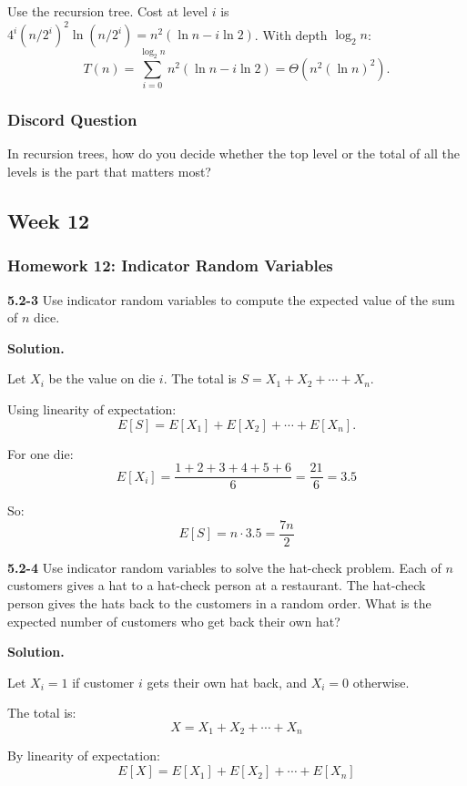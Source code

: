 \documentclass{article}
\theoremstyle{theorem}
\theoremstyle{definition}
\theoremstyle{remark}
\begin{document}
Use the recursion tree. Cost at level $i$ is $4^i(n/2^i)^2 \ln(n/2^i) = n^2(\ln n - i\ln 2)$. With depth $\log_2 n$:
\[
T(n) = \sum_{i=0}^{\log_2 n} n^2(\ln n - i\ln 2) = \Theta(n^2(\ln n)^2).
\]

\vspace{0.4cm}

\subsubsection{Discord Question}

In recursion trees, how do you decide whether the top level or the total of all the levels is the part that matters most?

\subsection{Week 12}

\subsubsection{Homework 12: Indicator Random Variables}

\textbf{5.2-3}
Use indicator random variables to compute the expected value of the sum of $n$ dice.

\textbf{Solution.}

Let $X_i$ be the value on die $i$. The total is $S = X_1 + X_2 + \cdots + X_n$.

Using linearity of expectation:
\[
E[S] = E[X_1] + E[X_2] + \cdots + E[X_n].
\]

For one die:
\[
E[X_i] = \frac{1 + 2 + 3 + 4 + 5 + 6}{6} = \frac{21}{6} = 3.5
\]

So:
\[
E[S] = n \cdot 3.5 = \frac{7n}{2}
\]

\vspace{0.3cm}

\textbf{5.2-4}
Use indicator random variables to solve the hat-check problem. Each of $n$ customers gives a hat to a hat-check person at a restaurant. The hat-check person gives the hats back to the customers in a random order. What is the expected number of customers who get back their own hat?

\textbf{Solution.}

Let $X_i = 1$ if customer $i$ gets their own hat back, and $X_i = 0$ otherwise.

The total is:
\[
X = X_1 + X_2 + \cdots + X_n
\]

By linearity of expectation:
\[
E[X] = E[X_1] + E[X_2] + \cdots + E[X_n]
\]
\end{document}
